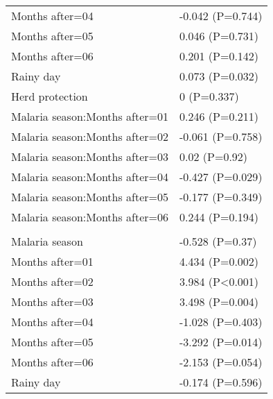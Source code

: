 \documentclass[]{article}
\begin{document}
\begin{longtable}[t]{ll}
\hspace{1em}Months after=04 & -0.042 (P=0.744)\\
\hspace{1em}Months after=05 & 0.046 (P=0.731)\\
\hspace{1em}Months after=06 & 0.201 (P=0.142)\\
\hspace{1em}Rainy day & 0.073 (P=0.032)\\
\hspace{1em}Herd protection & 0 (P=0.337)\\
\hspace{1em}Malaria season:Months after=01 & 0.246 (P=0.211)\\
\hspace{1em}Malaria season:Months after=02 & -0.061 (P=0.758)\\
\hspace{1em}Malaria season:Months after=03 & 0.02 (P=0.92)\\
\hspace{1em}Malaria season:Months after=04 & -0.427 (P=0.029)\\
\hspace{1em}Malaria season:Months after=05 & -0.177 (P=0.349)\\
\hspace{1em}Malaria season:Months after=06 & 0.244 (P=0.194)\\
\addlinespace[1.5em]
\multicolumn{2}{l}{\textbf{Temporary not field worker}}\\
\hspace{1em}Malaria season & -0.528 (P=0.37)\\
\hspace{1em}Months after=01 & 4.434 (P=0.002)\\
\hspace{1em}Months after=02 & 3.984 (P<0.001)\\
\hspace{1em}Months after=03 & 3.498 (P=0.004)\\
\hspace{1em}Months after=04 & -1.028 (P=0.403)\\
\hspace{1em}Months after=05 & -3.292 (P=0.014)\\
\hspace{1em}Months after=06 & -2.153 (P=0.054)\\
\hspace{1em}Rainy day & -0.174 (P=0.596)\\

\end{longtable}
\end{document}
